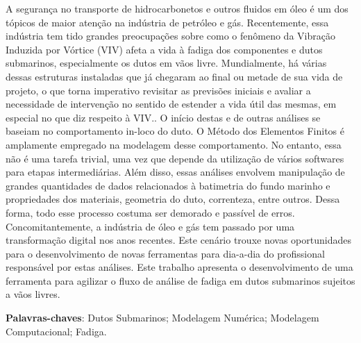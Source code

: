 
\setlength{\absparsep}{18pt} %
\begin{resumo}

    A segurança no transporte de hidrocarbonetos e outros fluidos em óleo é um dos tópicos de maior atenção na indústria de petróleo e gás.
    Recentemente, essa indústria tem tido grandes preocupações sobre como o fenômeno da Vibração Induzida por Vórtice (VIV) afeta a vida à fadiga dos componentes e dutos submarinos, especialmente os dutos em vãos livre.
    Mundialmente, há várias dessas estruturas instaladas que já chegaram ao final ou metade de sua vida de projeto, o que torna imperativo revisitar as previsões iniciais e avaliar a necessidade de intervenção no sentido de estender a vida útil das mesmas, em especial no que diz respeito à VIV..
    O início destas e de outras análises se baseiam no comportamento in-loco do duto.
    O Método dos Elementos Finitos é amplamente empregado na modelagem desse comportamento.
    No entanto, essa não é uma tarefa trivial, uma vez que depende da utilização de vários softwares para etapas intermediárias.
    Além disso, essas análises envolvem manipulação de grandes quantidades de dados relacionados à batimetria do fundo marinho e propriedades dos materiais, geometria do duto, correnteza, entre outros.
    Dessa forma, todo esse processo costuma ser demorado e passível de erros.
    Concomitantemente, a indústria de óleo e gás tem passado por uma transformação digital nos anos recentes.
    Este cenário trouxe novas oportunidades para o desenvolvimento de novas ferramentas para dia-a-dia do profissional responsável por estas análises.
    Este trabalho apresenta o desenvolvimento de uma ferramenta para agilizar o fluxo de análise de fadiga em dutos submarinos sujeitos a vãos livres.

    

 \textbf{Palavras-chaves}: Dutos Submarinos; Modelagem Numérica; Modelagem Computacional; Fadiga.
\end{resumo}

